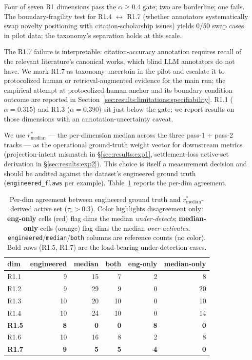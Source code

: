 Four of seven R1 dimensions pass the $\alpha \geq 0.4$ gate; two are borderline; one fails. The boundary-fragility test for R1.4 $\leftrightarrow$ R1.7 (whether annotators systematically swap novelty positioning with citation-scholarship issues) yields 0/50 swap cases in pilot data; the taxonomy's separation holds at this scale.

The R1.7 failure is interpretable: citation-accuracy annotation requires recall of the relevant literature's canonical works, which blind LLM annotators do not have. We mark R1.7 as taxonomy-uncertain in the pilot and escalate it to protocolized human or retrieval-augmented evidence for the main run; the empirical attempt at protocolized human anchor and its boundary-condition outcome are reported in Section~\ref{sec:results:limitations:specifiability}. R1.1 ($\alpha = 0.315$) and R1.3 ($\alpha = 0.390$) sit just below the gate; we report results on those dimensions with an annotation-uncertainty caveat.

We use $r^*_{\text{median}}$ --- the per-dimension median across the three pass-1 + pass-2 tracks --- as the operational ground-truth weight vector for downstream metrics (projection-intent mismatch in \S\ref{sec:results:exp1}, settlement-loss active-set derivation in \S\ref{sec:results:exp2}). This choice is itself a measurement decision and should be audited against the dataset's engineered ground truth (\texttt{engineered\_flaws} per example). Table~\ref{tab:rstar_vs_engineered} reports the per-dim agreement.

\begin{table}[t]
\centering
\caption{Per-dim agreement between engineered ground truth and $r^*_{\text{median}}$-derived active set ($\tau_r > 0.3$). Color highlights disagreement only: \textbf{eng-only} cells (red) flag dims the median \emph{under-detects}; \textbf{median-only} cells (orange) flag dims the median \emph{over-activates}. \texttt{engineered}/\texttt{median}/\texttt{both} columns are reference counts (no color). Bold rows (R1.5, R1.7) are the load-bearing under-detection cases.}
\label{tab:rstar_vs_engineered}
\begin{tabular}{lrrrrr}
\toprule
\textbf{dim} & \textbf{engineered} & \textbf{median} & \textbf{both} & \textbf{eng-only} & \textbf{median-only} \\
\midrule
R1.1 & 9 & 15 & 7 & 2 & 8 \\
R1.2 & 9 & 29 & 9 & 0 & \cellcolor{HMOver}20 \\
R1.3 & 10 & 20 & 10 & 0 & 10 \\
R1.4 & 10 & 24 & 10 & 0 & \cellcolor{HMOver}14 \\
\textbf{R1.5} & \textbf{8} & \textbf{0} & \textbf{0} & \cellcolor{HMUnder}\textbf{8} & \textbf{0} \\
R1.6 & 10 & 16 & 8 & 2 & 8 \\
\textbf{R1.7} & \textbf{9} & \textbf{5} & \textbf{5} & \cellcolor{HMUnder}\textbf{4} & \textbf{0} \\
\bottomrule
\end{tabular}
\end{table}

